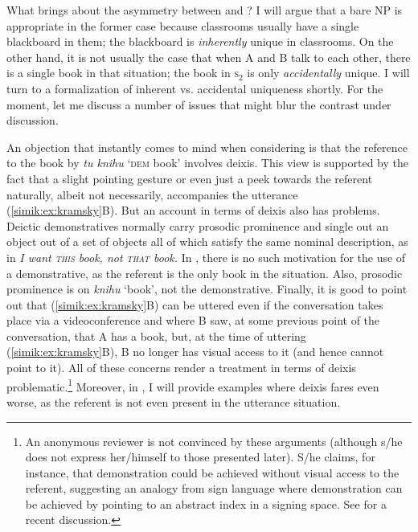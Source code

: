 \documentclass[output=paper,colorlinks,citecolor=brown,newtxmath]{langscibook}
\begin{document}
\noindent What brings about the asymmetry between  and ? I will argue that a bare NP is appropriate in the former case because classrooms usually have a single blackboard in them; the blackboard is \textit{inherently} unique in classrooms. On the other hand, it is not usually the case that when A and B talk to each other, there is a single book in that situation; the book in \textsc{s}$_2$ is only \textit{accidentally} unique. I will turn to a formalization of inherent vs. accidental uniqueness shortly. For the moment, let me discuss a number of issues that might blur the contrast under discussion.


An objection that instantly comes to mind when considering  is that the reference to the book by \textit{tu knihu} `\textsc{dem} book' involves deixis. This view is supported by the fact that a slight pointing gesture or even just a peek towards the referent naturally, albeit not necessarily, accompanies the utterance (\ref{simik:ex:kramsky}B). But an account in terms of deixis also has problems. Deictic demonstratives normally carry prosodic prominence and single out an object out of a set of objects all of which satisfy the same nominal description, as in \textit{I want \textsc{this} book, not \textsc{that} book.} In , there is no such motivation for the use of a demonstrative, as the referent is the only book in the situation. Also, prosodic prominence is on \textit{knihu} `book', not the demonstrative. Finally, it is good to point out that (\ref{simik:ex:kramsky}B) can be uttered even if the conversation takes place via a videoconference and where B saw, at some previous point of the conversation, that A has a book, but, at the time of uttering (\ref{simik:ex:kramsky}B), B no longer has visual access to it (and hence cannot point to it). All of these concerns render a treatment in terms of deixis problematic.\footnote{An anonymous reviewer is not convinced by these arguments (although s/he does not express her/himself to those presented later). S/he claims, for instance, that demonstration could be achieved without visual access to the referent, suggesting an analogy from sign language where demonstration can be achieved by pointing to an abstract index in a signing space. See \citet[Ch. 5]{Ahn2019} for a recent discussion.} Moreover, in , I will provide examples where deixis fares even worse, as the referent is not even present in the utterance situation.\largerpage[1.75]
\end{document}
